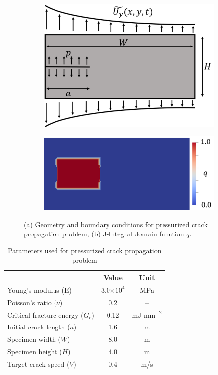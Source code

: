 \begin{figure}[h]
\begin{subfigure}{.49\textwidth}
  \centering
  \includegraphics[width=0.8\linewidth]{images/2d_propagation/fixed_surfing_schematic.pdf}
  \caption{}
  \label{fig:surfing_schematic}
\end{subfigure}%
\begin{subfigure}{.49\textwidth}
  \centering
  \vspace{1.06cm}
  \includegraphics[width=0.8\linewidth]{images/2d_propagation/q_field_legend.png}
  \vspace{1.06cm}
  \caption{}
  \label{fig:integration_domain}
\end{subfigure}%
  \caption{(a) Geometry and boundary conditions for pressurized crack propagation problem; (b) J-Integral domain function $q$. } 
  \label{fig:surfing_problem_setup}
\end{figure}

\begin{table}[h]
\centering
\caption{Parameters used for pressurized crack propagation problem}
\begin{tabular}[t]{lcc}
\hline
&Value &Unit \\
\hline
Young's modulus ($\text{E}$)&3.0$\times10^4$&MPa\\
Poisson's ratio ($\nu$)&0.2&--\\
Critical fracture energy  ($G_c$)&0.12&$\text{mJ mm}^{-2}$\\
Initial crack length ($a$)&1.6&m\\
Specimen width ($W$)&8.0&m\\
Specimen height ($H$)&4.0&m\\
Target crack speed ($V$)&0.4&m/s\\
\hline
\end{tabular}\label{material_properties_propagation}
\end{table}

